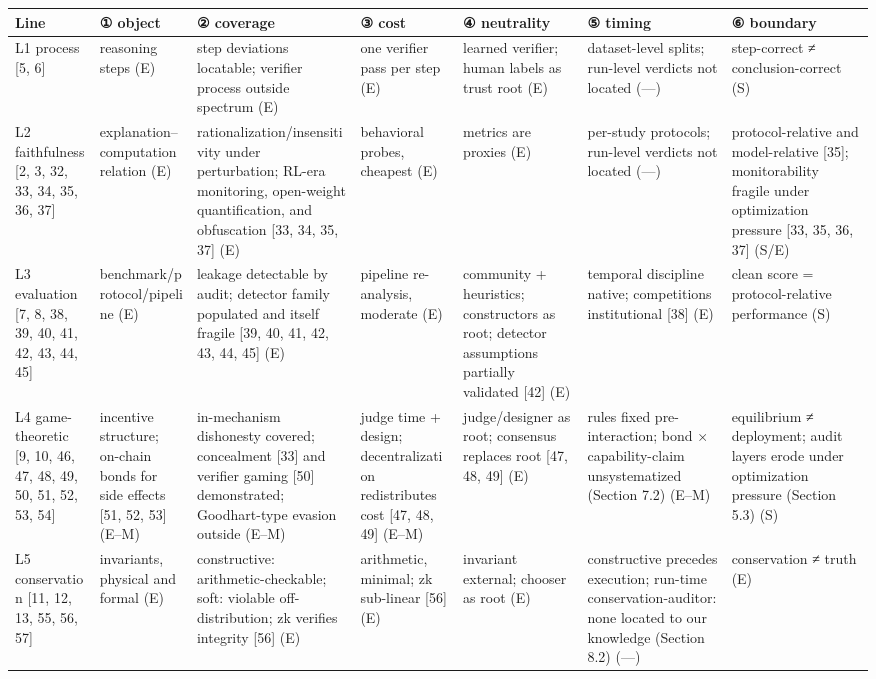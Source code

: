 \documentclass[11pt]{article}
\begin{document}
\noindent\begin{tabularx}{\textwidth}{@{}>{\raggedright\arraybackslash}p{} *{6}{>{\raggedright\arraybackslash}p{}}@{}}
\toprule
\textbf{Line} & \textbf{① object} & \textbf{② coverage} & \textbf{③ cost} & \textbf{④ neutrality} & \textbf{⑤ timing} & \textbf{⑥ boundary} \\
\midrule
L1 process [5, 6] & reasoning steps (E) & step deviations locatable; verifier process outside spectrum (E) & one verifier pass per step (E) & learned verifier; human labels as trust root (E) & dataset-level splits; run-level verdicts not located (—) & step-correct ≠ conclusion-correct (S) \\
L2 faithfulness [2, 3, 32, 33, 34, 35, 36, 37] & explanation–computation relation (E) & rationalization/insensitivity under perturbation; RL-era monitoring, open-weight quantification, and obfuscation [33, 34, 35, 37] (E) & behavioral probes, cheapest (E) & metrics are proxies (E) & per-study protocols; run-level verdicts not located (—) & protocol-relative and model-relative [35]; monitorability fragile under optimization pressure [33, 35, 36, 37] (S/E) \\
L3 evaluation [7, 8, 38, 39, 40, 41, 42, 43, 44, 45] & benchmark/protocol/pipeline (E) & leakage detectable by audit; detector family populated and itself fragile [39, 40, 41, 42, 43, 44, 45] (E) & pipeline re-analysis, moderate (E) & community + heuristics; constructors as root; detector assumptions partially validated [42] (E) & temporal discipline native; competitions institutional [38] (E) & clean score = protocol-relative performance (S) \\
L4 game-theoretic [9, 10, 46, 47, 48, 49, 50, 51, 52, 53, 54] & incentive structure; on-chain bonds for side effects [51, 52, 53] (E–M) & in-mechanism dishonesty covered; concealment [33] and verifier gaming [50] demonstrated; Goodhart-type evasion outside (E–M) & judge time + design; decentralization redistributes cost [47, 48, 49] (E–M) & judge/designer as root; consensus replaces root [47, 48, 49] (E) & rules fixed pre-interaction; bond × capability-claim unsystematized (Section 7.2) (E–M) & equilibrium ≠ deployment; audit layers erode under optimization pressure (Section 5.3) (S) \\
L5 conservation [11, 12, 13, 55, 56, 57] & invariants, physical and formal (E) & constructive: arithmetic-checkable; soft: violable off-distribution; zk verifies integrity [56] (E) & arithmetic, minimal; zk sub-linear [56] (E) & invariant external; chooser as root (E) & constructive precedes execution; run-time conservation-auditor: none located to our knowledge (Section 8.2) (—) & conservation ≠ truth (E) \\

\end{tabularx}
\end{document}
